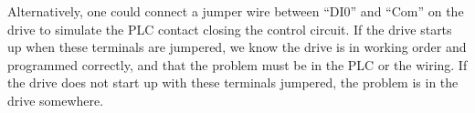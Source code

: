 \vskip 10pt

Alternatively, one could connect a jumper wire between ``DI0'' and ``Com'' on the drive to simulate the PLC contact closing the control circuit.  If the drive starts up when these terminals are jumpered, we know the drive is in working order and programmed correctly, and that the problem must be in the PLC or the wiring.  If the drive does not start up with these terminals jumpered, the problem is in the drive somewhere.




